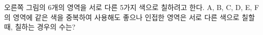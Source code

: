 \noindent\begin{minipage}[t]{0.58\linewidth}\vspace{0pt}\raggedright 오른쪽 그림의 6개의 영역을 서로 다른 5가지 색으로 칠하려고 한다. A, B, C, D, E, F의 영역에 같은 색을 중복하여 사용해도 좋으나 인접한 영역은 서로 다른 색으로 칠할 때, 칠하는 경우의 수는? \end{minipage}\hfill\begin{minipage}[t]{0.4\linewidth}\vspace{0pt}\centering \resizebox{\ifdim\width>\linewidth\linewidth\else\width\fi}{!}{}\end{minipage}\par
{}
